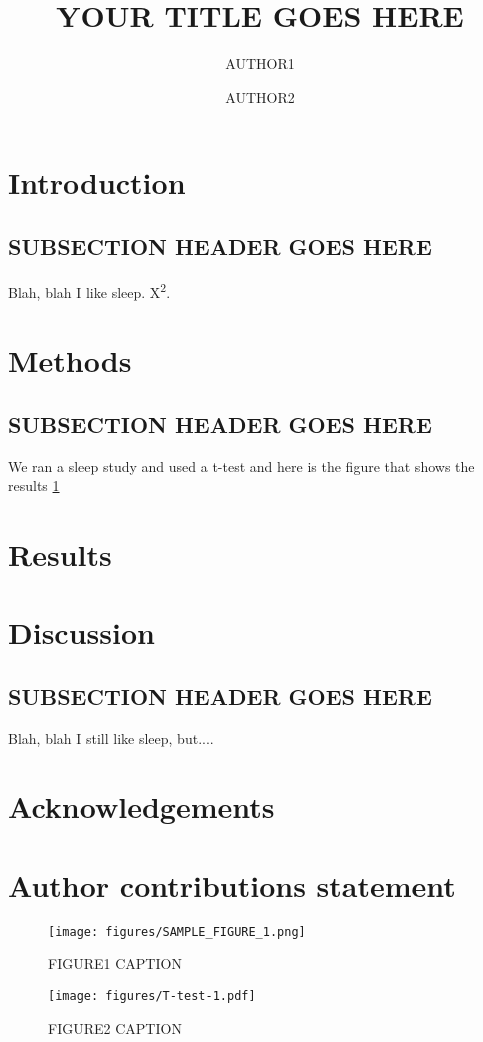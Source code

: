 \documentclass[fleqn,10pt]{wlscirep}
\title{YOUR TITLE GOES HERE}
\author[1,*]{AUTHOR1}
\author[1,*]{AUTHOR2}
\affil[*]{EMAIL}
\begin{document}
\maketitle

\section*{Introduction}
\subsection{SUBSECTION HEADER GOES HERE}
Blah, blah I like sleep. X\textsuperscript{2}. 

\section*{Methods}
\subsection{SUBSECTION HEADER GOES HERE}
We ran a sleep study and used a t-test \cite{students_t_1908} and here is the figure that shows the results \ref{fig:FIGURE1_LABEL}

\section*{Results}


\section*{Discussion}
\subsection{SUBSECTION HEADER GOES HERE}
Blah, blah I still like sleep, but.... \cite{Westlye2010}

\printbibliography{}

\section*{Acknowledgements}

\section*{Author contributions statement}

\printbibliography{}
\begin{figure}
\centering
\texttt{[image: figures/SAMPLE\_FIGURE\_1.png]}
\caption{FIGURE1 CAPTION}
\label{fig:FIGURE1_LABEL}
\end{figure}

\begin{figure}
\centering
\texttt{[image: figures/T-test-1.pdf]}
\caption{FIGURE2 CAPTION}
\label{fig:FIGURE2_LABEL}
\end{figure}
\end{document}
